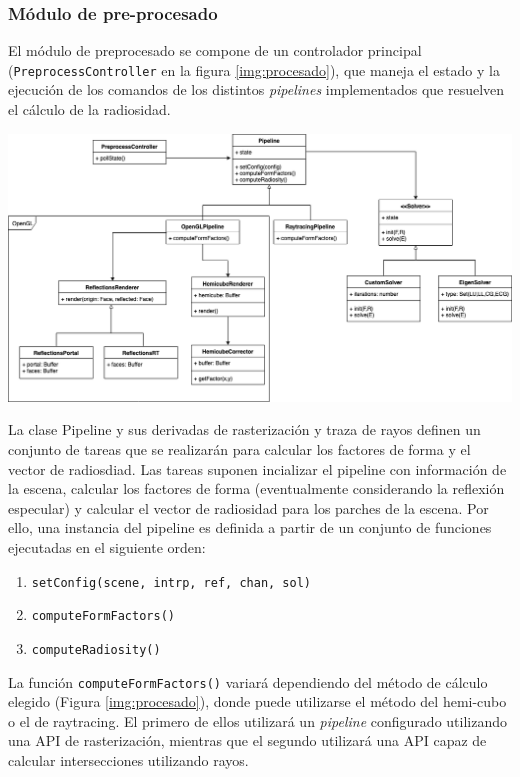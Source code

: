 \subsubsection{Módulo de pre-procesado}

El módulo de preprocesado se compone de un controlador principal (\verb|PreprocessController| en la figura \ref{img:procesado}), que maneja el estado y la ejecución de  los comandos de los distintos \textit{pipelines} implementados que resuelven el cálculo de la radiosidad.

\vspace{5mm}
\begin{minipage}[h]{\linewidth}
	\centering
	\includegraphics[width=\linewidth]{assets/preprocess}
	\label{img:procesado}
\end{minipage}


La clase Pipeline y sus derivadas de rasterización y traza de rayos definen un conjunto de tareas que se realizarán para calcular los factores de forma y el vector de radiosdiad. Las tareas suponen incializar el pipeline con información de la escena, calcular los factores de forma (eventualmente considerando la reflexión especular) y calcular el vector de radiosidad para los parches de la escena.
Por ello, una instancia del pipeline es definida a partir de un conjunto de funciones ejecutadas en el siguiente orden:

\begin{enumerate}
	\item \verb|setConfig(scene, intrp, ref, chan, sol)|
	\item \verb|computeFormFactors()|
	\item \verb|computeRadiosity()|
\end{enumerate}

La función \verb|computeFormFactors()| variará dependiendo del método de cálculo elegido (Figura \ref{img:procesado}), donde puede utilizarse el método del hemi-cubo o el de raytracing. El primero de ellos utilizará un \textit{pipeline} configurado utilizando una API de rasterización, mientras que el segundo utilizará una API capaz de calcular intersecciones utilizando rayos.


